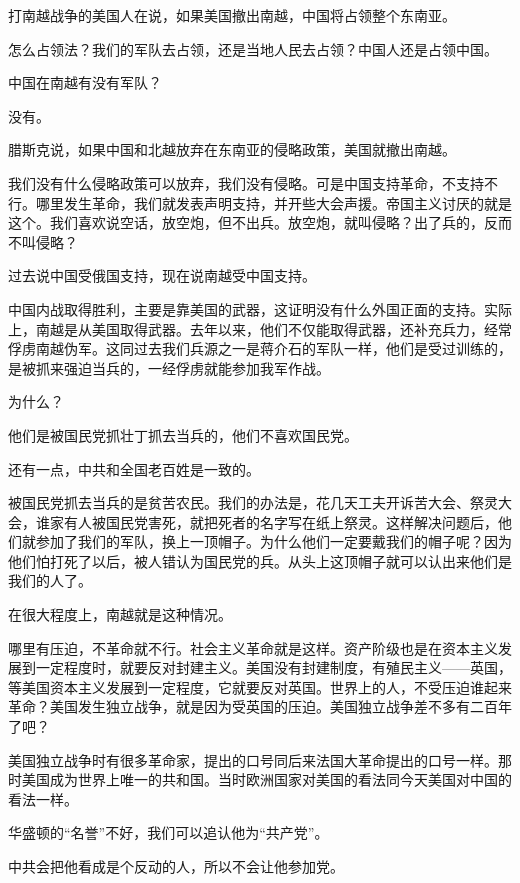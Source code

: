 打南越战争的美国人在说，如果美国撤出南越，中国将占领整个东南亚。

怎么占领法？我们的军队去占领，还是当地人民去占领？中国人还是占领中国。

中国在南越有没有军队？

没有。

腊斯克说，如果中国和北越放弃在东南亚的侵略政策，美国就撤出南越。

我们没有什么侵略政策可以放弃，我们没有侵略。可是中国支持革命，不支持不行。哪里发生革命，我们就发表声明支持，并开些大会声援。帝国主义讨厌的就是这个。我们喜欢说空话，放空炮，但不出兵。放空炮，就叫侵略？出了兵的，反而不叫侵略？

过去说中国受俄国支持，现在说南越受中国支持。

中国内战取得胜利，主要是靠美国的武器，这证明没有什么外国正面的支持。实际上，南越是从美国取得武器。去年以来，他们不仅能取得武器，还补充兵力，经常俘虏南越伪军。这同过去我们兵源之一是蒋介石的军队一样，他们是受过训练的，是被抓来强迫当兵的，一经俘虏就能参加我军作战。

为什么？

他们是被国民党抓壮丁抓去当兵的，他们不喜欢国民党。

还有一点，中共和全国老百姓是一致的。

被国民党抓去当兵的是贫苦农民。我们的办法是，花几天工夫开诉苦大会、祭灵大会，谁家有人被国民党害死，就把死者的名字写在纸上祭灵。这样解决问题后，他们就参加了我们的军队，换上一顶帽子。为什么他们一定要戴我们的帽子呢？因为他们怕打死了以后，被人错认为国民党的兵。从头上这顶帽子就可以认出来他们是我们的人了。

在很大程度上，南越就是这种情况。

哪里有压迫，不革命就不行。社会主义革命就是这样。资产阶级也是在资本主义发展到一定程度时，就要反对封建主义。美国没有封建制度，有殖民主义——英国，等美国资本主义发展到一定程度，它就要反对英国。世界上的人，不受压迫谁起来革命？美国发生独立战争，就是因为受英国的压迫。美国独立战争差不多有二百年了吧？

美国独立战争时有很多革命家，提出的口号同后来法国大革命提出的口号一样。那时美国成为世界上唯一的共和国。当时欧洲国家对美国的看法同今天美国对中国的看法一样。

华盛顿的“名誉”不好，我们可以追认他为“共产党”。

中共会把他看成是个反动的人，所以不会让他参加党。

